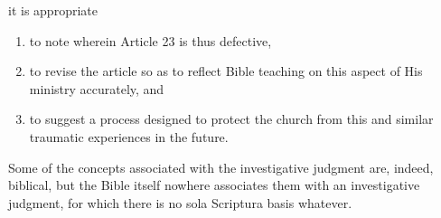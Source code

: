 it is appropriate
\begin{enumerate}
	\item to note wherein Article 23 is thus defective,
	\item to revise the article so
as to reflect Bible teaching on this aspect of His ministry accurately, and
	\item to suggest a process designed to protect the church from this and
similar traumatic experiences in the future.
\end{enumerate}

Some of the concepts associated with the investigative judgment are, indeed,
biblical, but the Bible itself nowhere associates them with an investigative
judgment, for which there is no sola Scriptura basis whatever.

